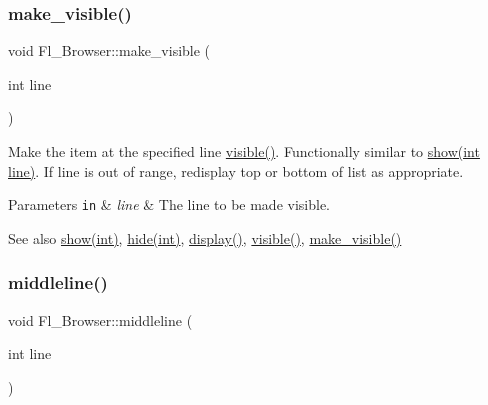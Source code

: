 \subsubsection{\texorpdfstring{make\+\_\+visible()}{make\_visible()}}
{\footnotesize\ttfamily void Fl\+\_\+\+Browser\+::make\+\_\+visible (\begin{DoxyParamCaption}\item[{int}]{line }\end{DoxyParamCaption})\hspace{0.3cm}{\ttfamily [inline]}}

Make the item at the specified {\ttfamily line} \hyperlink{class_fl___browser_a04052ea5a7c193a09df752b7fe4595df}{visible()}. Functionally similar to \hyperlink{class_fl___browser_a747329b9fc4ebe4c634f80e211e1518c}{show(int line)}. If {\ttfamily line} is out of range, redisplay top or bottom of list as appropriate. 
\begin{DoxyParams}[1]{Parameters}
\mbox{\tt in}  & {\em line} & The line to be made visible. \\
\hline
\end{DoxyParams}
\begin{DoxySeeAlso}{See also}
\hyperlink{class_fl___browser_a747329b9fc4ebe4c634f80e211e1518c}{show(int)}, \hyperlink{class_fl___browser_aa9e3cf5f379f53b88b03ef8968cb5b2e}{hide(int)}, \hyperlink{class_fl___browser_ade1a745e0ceaae412f4365a0057598da}{display()}, \hyperlink{class_fl___browser_a04052ea5a7c193a09df752b7fe4595df}{visible()}, \hyperlink{class_fl___browser_ab104eab731c1d2036efb84a628b2dd55}{make\+\_\+visible()} 
\end{DoxySeeAlso}
\mbox{\label{class_fl___browser_aeed63f2ef05839563c626c349fc40292}} 
\subsubsection{\texorpdfstring{middleline()}{middleline()}}
{\footnotesize\ttfamily void Fl\+\_\+\+Browser\+::middleline (\begin{DoxyParamCaption}\item[{int}]{line }\end{DoxyParamCaption})\hspace{0.3cm}{\ttfamily [inline]}}

